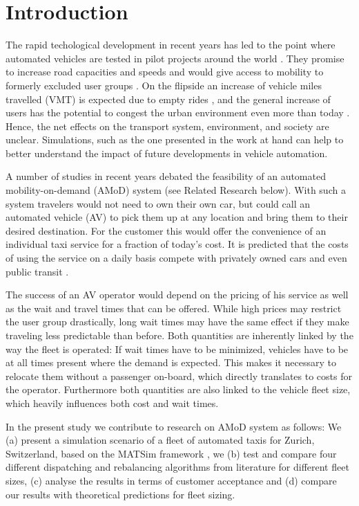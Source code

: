 \section{Introduction}

The rapid techological development in recent years has led to the point where
automated vehicles are tested in pilot projects around the world \citep{ackerman2017hail}.
They promise to increase road
capacities and speeds \citep{Tientrakool2011,Friedrich2015} and would give access to mobility to formerly
excluded user groups \citep{Truong2017}. On the flipside an increase of vehicle
miles travelled (VMT) is expected due to empty rides \citep{Litman2014}, and the general increase
of users has the potential to congest the urban environment even more than today \citep{Meyer2017}.
Hence, the net effects on
the transport system, environment, and society are unclear. Simulations, such as
the one presented in the work at hand can help to better understand the impact
of future developments in vehicle automation.

A number of studies in recent years debated the feasibility of an automated
mobility-on-demand (AMoD) system (see Related Research below). With such a system travelers
would not need to own their own car, but could call an automated vehicle (AV) to pick
them up at any location and bring them to their desired destination. For the customer
this would offer the convenience of an individual taxi service
for a fraction of today's cost. It is predicted that the costs of using the
service on a daily basis compete with privately owned cars and even
public transit \citep{Bosch2016a}.

The success of an AV operator would depend on the pricing of his service
as well as the wait and travel times that can be offered. While high prices
may restrict the user group drastically, long wait times may have the same effect
if they make traveling less predictable than before. Both quantities are inherently
linked by the way the fleet is operated: If wait times have to be minimized, vehicles
have to be at all times present where the demand is expected. This makes it necessary to
relocate them without a passenger on-board, which directly translates to costs for
the operator. Furthermore both quantities are also linked to the vehicle fleet
size, which heavily influences both cost and wait times.

In the present study we contribute to research on AMoD system as follows: We
(a) present a simulation scenario of a fleet of automated taxis for Zurich, Switzerland,
based on the MATSim framework \citep{Horni2015}, we (b) test and compare four different dispatching
and rebalancing algorithms from literature for different fleet sizes, (c) analyse the results
in terms of customer acceptance and (d) compare our results with theoretical
predictions for fleet sizing.


